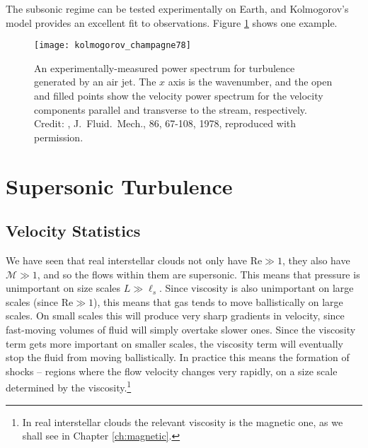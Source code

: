 The subsonic regime can be tested experimentally on Earth, and Kolmogorov's model provides an excellent fit to observations. Figure \ref{fig:kolmogorov} shows one example.

\begin{figure}
\texttt{[image: kolmogorov\_champagne78]}
\caption[Experimental power spectra for Kolmogorov turbulence]{
\label{fig:kolmogorov}
An experimentally-measured power spectrum for turbulence generated by an air jet. The $x$ axis is the wavenumber, and the open and filled points show the velocity power spectrum for the velocity components parallel and transverse to the stream, respectively. Credit: \citeauthor{champagne78a}, J.~Fluid.~Mech., 86, 67-108, 1978, reproduced with permission.
}
\end{figure}

\section{Supersonic Turbulence}

\subsection{Velocity Statistics}

We have seen that real interstellar clouds not only have $\mathrm{Re} \gg 1$, they also have $\mathcal{M} \gg 1$, and so the flows within them are supersonic. This means that pressure is unimportant on size scales $L \gg \ell_s$. Since viscosity is also unimportant on large scales (since $\mbox{Re} \gg 1$), this means that gas tends to move ballistically on large scales. On small scales this will produce very sharp gradients in velocity, since fast-moving volumes of fluid will simply overtake slower ones. Since the viscosity term gets more important on smaller scales, the viscosity term will eventually stop the fluid from moving ballistically. In practice this means the formation of shocks -- regions where the flow velocity changes very rapidly, on a size scale determined by the viscosity.\footnote{In real interstellar clouds the relevant viscosity is the magnetic one, as we shall see in Chapter \ref{ch:magnetic}.}

